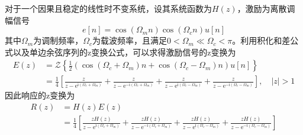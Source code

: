 \begin{example}
    对于一个因果且稳定的线性时不变系统，设其系统函数为$H(z)$，激励为离散调幅信号
    $$e[n]=\cos(\Omega_m n)\cos(\Omega_c n)u[n]$$
    其中$\Omega_m$为调制频率，$\Omega_c$为载波频率，且满足$0<\Omega_m\ll\Omega_c<\pi$。利用积化和差公式以及单边余弦序列的z变换公式，可以求得激励信号的z变换为
    \begin{align*}
        E(z)&=\mathcal{Z}\left\{\frac{1}{2}\left(\cos(\Omega_c+\Omega_m)n+\cos(\Omega_c-\Omega_m)n\right)u[n]\right\}\\
        &=\frac{1}{4}\left[\frac{z}{z-\mathrm{e}^{\mathrm{i}(\Omega_c+\Omega_m)}}+\frac{z}{z-\mathrm{e}^{-\mathrm{i}(\Omega_c+\Omega_m)}}+\frac{z}{z-\mathrm{e}^{\mathrm{i}(\Omega_c-\Omega_m)}}+\frac{z}{z-\mathrm{e}^{-\mathrm{i}(\Omega_c-\Omega_m)}}\right],\quad |z|>1
    \end{align*}
    因此响应的z变换为
    \begin{align*}
        R(z)&=H(z)E(z)\\
        &=\frac{1}{4}\left[\frac{zH(z)}{z-\mathrm{e}^{\mathrm{i}(\Omega_c+\Omega_m)}}+\frac{zH(z)}{z-\mathrm{e}^{-\mathrm{i}(\Omega_c+\Omega_m)}}+\frac{zH(z)}{z-\mathrm{e}^{\mathrm{i}(\Omega_c-\Omega_m)}}+\frac{zH(z)}{z-\mathrm{e}^{-\mathrm{i}(\Omega_c-\Omega_m)}}\right]
    \end{align*}


\end{example}
